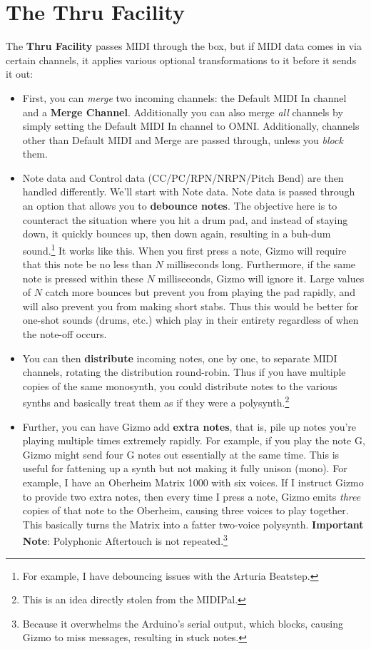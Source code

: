 \documentclass{article}
\begin{document}
\section{The Thru Facility}
\label{thru}

The {\bf Thru Facility} passes MIDI through the box, but if MIDI data comes in via certain channels, it applies various optional transformations to it before it sends it out:

\begin{itemize}
\item First, you can {\it merge} two incoming channels: the Default MIDI In channel and a {\bf Merge Channel}.  Additionally you can also merge {\it all} channels by simply setting the Default MIDI In channel to OMNI.  Additionally, channels other than Default MIDI and Merge are passed through, unless you {\it block} them.

\item Note data and Control data (CC/PC/RPN/NRPN/Pitch Bend) are then handled differently. We'll start with Note data.   Note data is passed through an option that allows you to {\bf debounce notes}.   The objective here is to counteract the situation where you hit a drum pad, and instead of staying down, it quickly bounces up, then down again, resulting in a buh-dum sound.\footnote{For example, I have debouncing issues with the Arturia Beatstep.}  It works like this.  When you first press a note, Gizmo will require that this note be no less than \(N\) milliseconds long.  Furthermore, if the same note is pressed within these \(N\) milliseconds, Gizmo will ignore it.     Large values of \(N\) catch more bounces but prevent you from playing the pad rapidly, and will also prevent you from making short stabs.  Thus this would be better for one-shot sounds (drums, etc.) which play in their entirety regardless of when the note-off occurs.

\item You can then {\bf distribute} incoming notes, one by one, to separate MIDI channels, rotating the distribution round-robin.  Thus if you have multiple copies of the same monosynth, you could distribute notes to the various synths and basically treat them as if they were a polysynth.\footnote{This is an idea directly stolen from the MIDIPal.}

\item Further, you can have Gizmo add {\bf extra notes}, that is, pile up notes you're playing multiple times extremely rapidly.  For example, if you play the note G, Gizmo might send four G notes out essentially at the same time.  This is useful for fattening up a synth but not making it fully unison (mono).  For example, I have an Oberheim Matrix 1000 with six voices.  If I instruct Gizmo to provide two extra notes, then every time I press a note, Gizmo emits {\it three} copies of that note to the Oberheim, causing three voices to play together.  This basically turns the Matrix into a fatter two-voice polysynth.  {\bf Important Note}: Polyphonic Aftertouch is not repeated.\footnote{\label{serialbuffer}Because it overwhelms the Arduino's serial output, which blocks, causing Gizmo to miss messages, resulting in stuck notes.}


\end{itemize}
\end{document}
